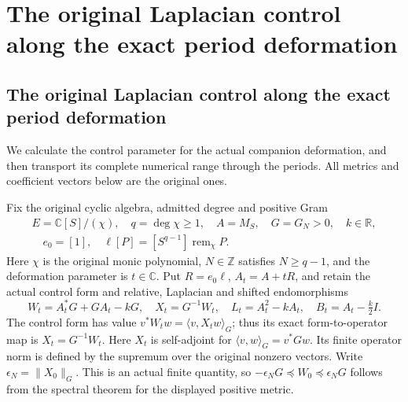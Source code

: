 \begingroup

\section{The original Laplacian control along the exact period deformation}


\subsection{The original Laplacian control along the exact period deformation}
\label{sec:period-laplacian-control-bridge}

We calculate the control parameter for the actual companion deformation,
and then transport its complete numerical range through the periods.
All metrics and coefficient vectors below are the original ones.

Fix the original cyclic algebra, admitted degree and positive Gram
\[
 \begin{gathered}
 E=\mathbb C[S]/(\chi),\quad q=\deg\chi\ge1,\quad
 A=M_S,\quad G=G_N>0,\quad k\in\mathbb R,
 \\
 \quad e_0=[1],\quad
 \ell[P]=[S^{q-1}]\operatorname{rem}_{\chi}P.
 \end{gathered}
 \tag{LC1}
\]
Here $\chi$ is the original monic polynomial, $N\in\mathbb Z$ satisfies
$N\ge q-1$, and the deformation parameter is $t\in\mathbb C$.
Put \(R=e_0\ell\), \(A_t=A+tR\), and retain the actual control form
and relative, Laplacian and shifted endomorphisms
\[
 W_t=A_t^*G+GA_t-kG,\quad X_t=G^{-1}W_t,\quad
 L_t=A_t^2-kA_t,\quad B_t=A_t-\tfrac k2I.
 \tag{LC2}
\]
The control form has value $v^*W_tw=\langle v,X_tw\rangle_G$;
thus its exact form-to-operator map is $X_t=G^{-1}W_t$.
Here \(X_t\) is self-adjoint for
\(\langle v,w\rangle_G=v^*Gw\). Its finite operator norm is defined
by the supremum over the original nonzero vectors. Write
\(\epsilon_N=\|X_0\|_G\). This is an actual finite quantity, so
\(-\epsilon_NG\preceq W_0\preceq\epsilon_NG\) follows from the
spectral theorem for the displayed positive metric.

